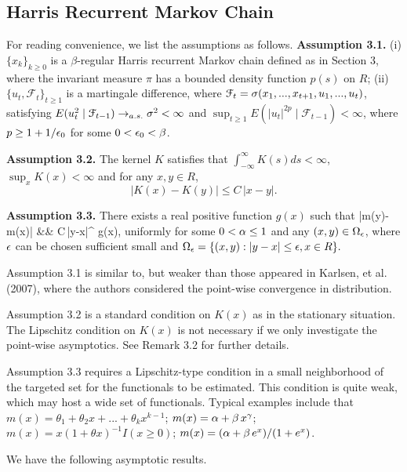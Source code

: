 \subsection{Harris Recurrent Markov Chain}
For reading convenience, we list the assumptions as follows.
\vskip 0.3cm
 \textbf{Assumption 3.1.} (i) $\{x_k\}_{k\ge 0}$ is a $\beta$-regular Harris recurrent Markov chain defined as in Section 3,
where   the invariant measure $\pi$ has a bounded  density function $p(s)$ on $R$;
(ii) $\{u_t, {\mathcal F}_t\}_{t\ge 1}$ is a martingale difference, where ${\mathcal F}_t=\sigma (x_1, ..., x_{t+1}, u_1,...,u_t)$, satisfying
 $E(u_t^2\mid {\mathcal F}_{t-1})\to_{a.s.} \sigma^2<\infty$ and $ \sup_{t\ge 1}E(|u_t|^{2p}\mid {\mathcal F}_{t-1})<\infty$, where  $p\ge 1+1/\epsilon_0$ for some $0<\epsilon_0<\beta$.



 \vskip 0.3cm \textbf{Assumption 3.2.} The kernel $K$ satisfies that $\int_{-\infty}^{\infty}K(s)ds<\infty$, $\sup_xK(x)<\infty$
 and for any $x, y \in R$,
$$
|K(x)-K(y)| \le C\, |x-y|.
$$

\vskip 0.3cm \textbf{Assumption 3.3.}
There   exists a real positive function $g(x)$ such that
\bestar
|m(y)-m(x)| &\leq& C\,|y-x|^{\alpha} g(x),\eestar
uniformly for some $0<\alpha\le 1$ and  any  $(x, y)\in \Omega_\epsilon$, where $\epsilon$ can be chosen sufficient small and
$
\Omega_{\epsilon} = \{(x,y): |y-x|\le \epsilon, x\in R\}.
$


\vskip 0.3cm
Assumption 3.1 is similar to, but weaker than  those appeared in Karlsen, et al. (2007), where  the authors considered the point-wise convergence in distribution.

Assumption 3.2 is a standard condition on $K(x)$  as in the stationary
situation. The Lipschitz condition on $K(x)$ is not necessary if we
only investigate the point-wise asymptotics. See Remark 3.2 for
further details.

Assumption 3.3 requires a Lipschitz-type condition in a small
neighborhood of the targeted  set for the functionals to be
estimated. This condition is quite weak, which may host a wide set
of functionals. Typical examples  include that $m(x)=\theta_1+\theta_2x+...+\theta_kx^{k-1}$;
 $m(x)=\alpha+ \beta\, x^{\gamma}$;
 $m(x)=x(1+\theta x)^{-1}I(x\ge 0)$;
 $m(x)=(\alpha+\beta\, e^{x})/(1+e^x)$.



\medskip

We have the following asymptotic results.

